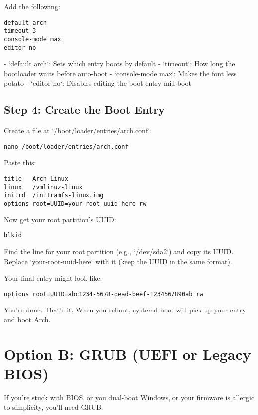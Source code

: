 \documentclass[12pt,openany]{book}
\begin{document}
Add the following:

\begin{lstlisting}
default arch
timeout 3
console-mode max
editor no
\end{lstlisting}

- `default arch`: Sets which entry boots by default
- `timeout`: How long the bootloader waits before auto-boot
- `console-mode max`: Makes the font less potato
- `editor no`: Disables editing the boot entry mid-boot

\subsection*{Step 4: Create the Boot Entry}

Create a file at `/boot/loader/entries/arch.conf`:

\begin{lstlisting}
nano /boot/loader/entries/arch.conf
\end{lstlisting}

Paste this:

\begin{lstlisting}
title   Arch Linux
linux   /vmlinuz-linux
initrd  /initramfs-linux.img
options root=UUID=your-root-uuid-here rw
\end{lstlisting}

Now get your root partition’s UUID:

\begin{lstlisting}
blkid
\end{lstlisting}

Find the line for your root partition (e.g., `/dev/sda2`) and copy its UUID. Replace `your-root-uuid-here` with it (keep the UUID in the same format).

Your final entry might look like:

\begin{lstlisting}
options root=UUID=abc1234-5678-dead-beef-1234567890ab rw
\end{lstlisting}

You’re done. That’s it. When you reboot, systemd-boot will pick up your entry and boot Arch.

\section{Option B: GRUB (UEFI or Legacy BIOS)}

If you’re stuck with BIOS, or you dual-boot Windows, or your firmware is allergic to simplicity, you’ll need GRUB.
\end{document}
